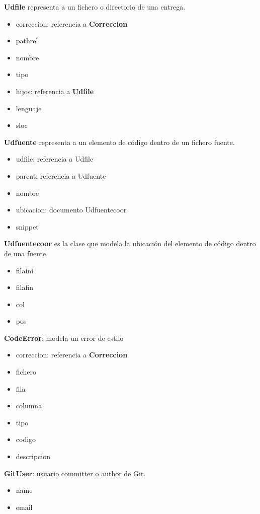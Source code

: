 \textbf{Udfile} representa a un fichero o directorio de una entrega.
\begin{itemize}
\item correccion: referencia a \textbf{Correccion}
\item pathrel
\item nombre
\item tipo
\item hijos: referencia a \textbf{Udfile}
\item lenguaje
\item sloc
\end{itemize}


\textbf{Udfuente} representa a un elemento de código dentro de un fichero fuente.
\begin{itemize}
\item udfile: referencia a Udfile
\item parent: referencia a Udfuente
\item nombre
\item ubicacion: documento Udfuentecoor
\item snippet
\end{itemize}


\textbf{Udfuentecoor} es la clase que modela la ubicación del elemento de código dentro de una fuente.
\begin{itemize}
\item filaini
\item filafin
\item col
\item pos
\end{itemize}


\textbf{CodeError}: modela un error de estilo
\begin{itemize}
\item correccion: referencia a \textbf{Correccion}
\item fichero
\item fila
\item columna
\item tipo
\item codigo
\item descripcion
\end{itemize}

\textbf{GitUser}: usuario committer o author de Git.
\begin{itemize}
\item  name
\item email
\end{itemize}


